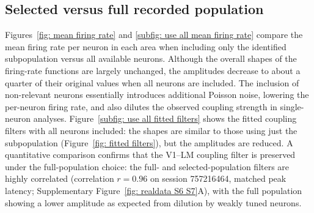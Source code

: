 \documentclass[12pt]{article}
\begin{document}
\begin{table}
\caption{Comparison of models that consider coupling/history effects. I decided to use the model with coupling, history, and $\Lambda^2$ based on AIC and stability. The outcome of the GLM is probe C (i.e. V1) pooled spike trains. In this table, ``coupling" means the coupling effects (coupling filter convolved with the spike trains of another area ) from all other five areas; history effect means the post-spike filter convolved with the spike trains of itself; 1st and 2nd order correction on history/coupling mean I allow the post-spike filter/ coupling filter to change when different $\Lambda$; $\Lambda^2 $ just means adding $\Lambda^2$ to the right-hand-side of the equation as a predictor. Besides the predictors in the table, the GLMs also include the time-warped inhomogeneous baseline and the trial-wise gain constant. I fit running and stationary models separately to account for speed's effects, then add the AIC of the two models together. Stability is estimated by doing simulations, both fragile (sometimes explode) and divergent (always explode) are labeled as ``No" in the last column of stability. Details and equations for these models are in Supplementary. }
\label{table: coupling}
\end{table}

\subsection*{Selected versus full recorded population}
\label{sec:supp full vs selected}

Figures~\ref{fig: mean firing rate} and \ref{subfig: use all mean firing rate} compare the mean firing rate per neuron in each area when including only the identified subpopulation versus all available neurons. Although the overall shapes of the firing-rate functions are largely unchanged, the amplitudes decrease to about a quarter of their original values when all neurons are included. The inclusion of non-relevant neurons essentially introduces additional Poisson noise, lowering the per-neuron firing rate, and also dilutes the observed coupling strength in single-neuron analyses. Figure~\ref{subfig: use all fitted filters} shows the fitted coupling filters with all neurons included: the shapes are similar to those using just the subpopulation (Figure~\ref{fig: fitted filters}), but the amplitudes are reduced. A quantitative comparison confirms that the V1--LM coupling filter is preserved under the full-population choice: the full- and selected-population filters are highly correlated (correlation $r=0.96$ on session 757216464, matched peak latency; Supplementary Figure~\ref{fig: realdata S6 S7}A), with the full population showing a lower amplitude as expected from dilution by weakly tuned neurons.
\end{document}
